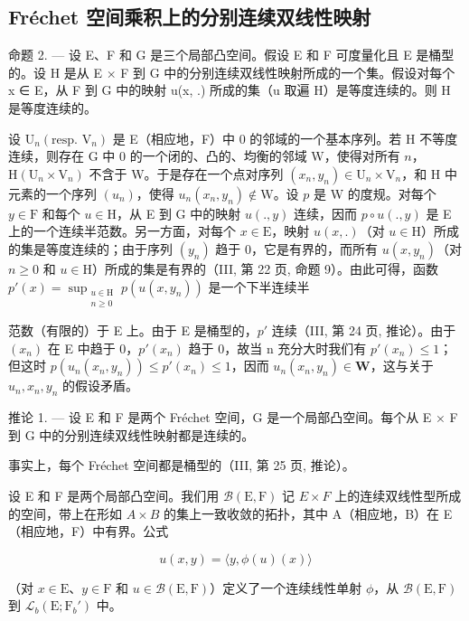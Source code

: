 \subsection{Fréchet 空间乘积上的分别连续双线性映射}

命题 2. --- 设 E、F 和 G 是三个局部凸空间。假设 E 和 F 可度量化且 E 是桶型的。设 H 是从 E × F 到 G 中的分别连续双线性映射所成的一个集。假设对每个 x ∈ E，从 F 到 G 中的映射 u(x, .) 所成的集（u 取遍 H）是等度连续的。则 H 是等度连续的。

设 \(\mathrm{U}_n(\text{resp. } \mathrm{V}_n)\) 是 E（相应地，F）中 0 的邻域的一个基本序列。若 H 不等度连续，则存在 G 中 0 的一个闭的、凸的、均衡的邻域 W，使得对所有 \(n\)，\(\mathrm{H}(\mathrm{U}_n \times \mathrm{V}_n)\) 不含于 W。于是存在一个点对序列 \((x_n, y_n) \in \mathrm{U}_n \times \mathrm{V}_n\)，和 H 中元素的一个序列 \((u_n)\)，使得 \(u_n(x_n, y_n) \notin \mathrm{W}\)。设 \(p\) 是 W 的度规。对每个 \(y \in \mathrm{F}\) 和每个 \(u \in \mathrm{H}\)，从 E 到 G 中的映射 \(u(., y)\) 连续，因而 \(p \circ u(., y)\) 是 E 上的一个连续半范数。另一方面，对每个 \(x \in \mathrm{E}\)，映射 \(u(x, .)\)（对 \(u \in \mathrm{H}\)）所成的集是等度连续的；由于序列 \((y_n)\) 趋于 0，它是有界的，而所有 \(u(x, y_n)\)（对 \(n \geqslant 0\) 和 \(u \in \mathrm{H}\)）所成的集是有界的（III, 第 22 页, 命题 9）。由此可得，函数 \(p'(x) = \sup_{\substack{u \in \mathrm{H} \\ n \geqslant 0}} p(u(x, y_n))\) 是一个下半连续半

范数（有限的）于 E 上。由于 E 是桶型的，\(p'\) 连续（III, 第 24 页, 推论）。由于 \((x_{n})\) 在 E 中趋于 0，\(p'(x_{n})\) 趋于 0，故当 n 充分大时我们有 \(p'(x_{n}) \leqslant 1\)；但这时 \(p(u_{n}(x_{n}, y_{n})) \leqslant p'(x_{n}) \leqslant 1\)，因而 \(u_{n}(x_{n}, y_{n}) \in \mathbf{W}\)，这与关于 \(u_{n}, x_{n}, y_{n}\) 的假设矛盾。

推论 1. --- 设 E 和 F 是两个 Fréchet 空间，G 是一个局部凸空间。每个从 E × F 到 G 中的分别连续双线性映射都是连续的。

事实上，每个 Fréchet 空间都是桶型的（III, 第 25 页, 推论）。

设 E 和 F 是两个局部凸空间。我们用 \(\mathcal{B}(\mathrm{E},\mathrm{F})\) 记 \(E \times F\) 上的连续双线性型所成的空间，带上在形如 \(A \times B\) 的集上一致收敛的拓扑，其中 A（相应地，B）在 E（相应地，F）中有界。公式

\[
u (x, y) = \langle y, \phi (u) (x) \rangle
\]

（对 \(x \in \mathrm{E}\)、\(y \in \mathrm{F}\) 和 \(u \in \mathcal{B}(\mathrm{E}, \mathrm{F})\)）定义了一个连续线性单射 \(\phi\)，从 \(\mathcal{B}(\mathrm{E}, \mathrm{F})\) 到 \(\mathcal{L}_b(\mathrm{E}; \mathrm{F}_b')\) 中。

